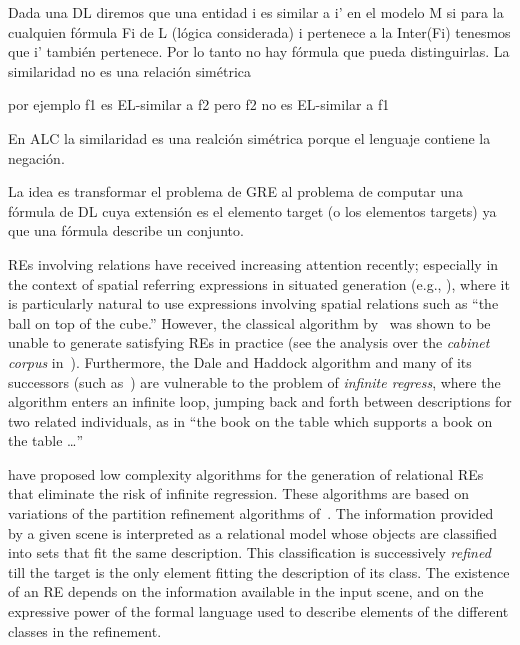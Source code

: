 Dada una DL diremos que una entidad i es similar a i' en el modelo M si para la cualquien f\'ormula Fi de L (l\'ogica considerada) i pertenece a la Inter(Fi) tenesmos que i' tambi\'en pertenece. Por lo tanto no hay f\'ormula que pueda distinguirlas. La similaridad no es una relaci\'on sim\'etrica

por ejemplo f1 es EL-similar a f2 pero f2 no es EL-similar a f1 

En ALC la similaridad es una realci\'on sim\'etrica porque el lenguaje contiene la negaci\'on.

La idea es transformar el problema de GRE al problema de computar una f\'ormula de DL cuya extensi\'on es el elemento target (o los elementos targets) ya que una f\'ormula describe un conjunto.

REs involving relations have received increasing attention recently;
especially in the context of spatial referring expressions in situated
generation (e.g., \cite{kelleher06:increm}),
where it is particularly natural to use expressions involving spatial
relations such as ``the ball on top of the cube.''  However, the
classical algorithm
by~\cite{dale91:gener} was shown to be
unable to generate satisfying REs in practice (see the analysis over
the \emph{cabinet corpus}
in~\cite{viethen06:algor}).  Furthermore, the
Dale and Haddock algorithm and many of its successors (such
as~\cite{kelleher06:increm}) are vulnerable to
the problem of \emph{infinite regress}, where the algorithm enters an
infinite loop, jumping back and forth between descriptions for two
related individuals, as in ``the book on the table which supports a
book on the table \ldots''

\cite{arec2:2008:Areces,arec:usin11} have proposed low complexity
algorithms for the generation of relational REs
that eliminate the risk of infinite regression.  These algorithms are
based on variations of the partition refinement algorithms
of~\cite{paig:thre87}.  The information provided by a given scene
is interpreted as a relational model whose objects are classified into
sets that fit the same description.  This classification is
successively \emph{refined} till the target is the only element
fitting the description of its class.  The existence of an RE depends
on the information available in the input scene, and on the expressive
power of the formal language used to describe elements of the
different classes in the refinement.

